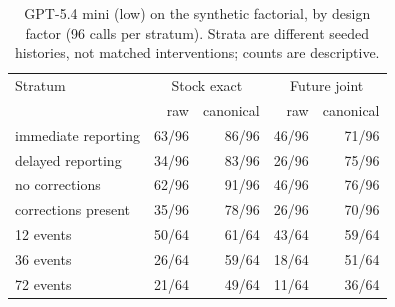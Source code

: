\begin{table}[htbp]
\centering\small
\begin{tabular}{lrrrr}
\toprule
Stratum & \multicolumn{2}{c}{Stock exact} & \multicolumn{2}{c}{Future joint} \\
 & raw & canonical & raw & canonical \\
\midrule
immediate reporting & 63/96 & 86/96 & 46/96 & 71/96 \\
delayed reporting & 34/96 & 83/96 & 26/96 & 75/96 \\
no corrections & 62/96 & 91/96 & 46/96 & 76/96 \\
corrections present & 35/96 & 78/96 & 26/96 & 70/96 \\
12 events & 50/64 & 61/64 & 43/64 & 59/64 \\
36 events & 26/64 & 59/64 & 18/64 & 51/64 \\
72 events & 21/64 & 49/64 & 11/64 & 36/64 \\
\bottomrule
\end{tabular}
\caption{GPT-5.4 mini (low) on the synthetic factorial, by design factor (96 calls per stratum). Strata are different seeded histories, not matched interventions; counts are descriptive.}
\label{tab:factors}
\end{table}
